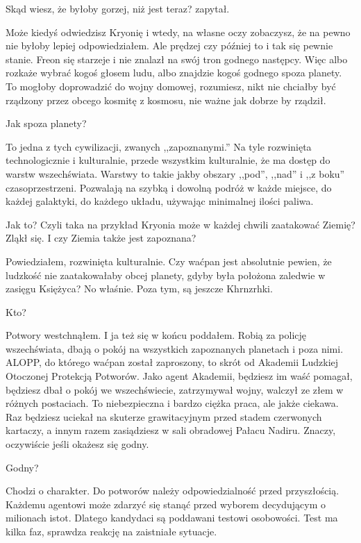 \ds{} Skąd wiesz, że byłoby gorzej, niż jest teraz? \dm{} zapytał. \de{}

\ds{} Może kiedyś odwiedzisz Kryonię i wtedy, na własne oczy zobaczysz, że na pewno nie byłoby lepiej \dm{} odpowiedziałem. \dm{}
Ale prędzej czy później to i tak się pewnie stanie. Freon się starzeje i nie znalazł na swój tron godnego następcy. 
Więc albo rozkaże wybrać kogoś głosem ludu, albo znajdzie kogoś godnego spoza planety. To mogłoby doprowadzić do wojny domowej, 
rozumiesz, nikt nie chciałby być rządzony przez obcego kosmitę z kosmosu, nie ważne jak dobrze by rządził. \de{}

\ds{} Jak spoza planety? \de{}

\ds{} To jedna z tych cywilizacji, zwanych ,,zapoznanymi.'' Na tyle rozwinięta technologicznie i kulturalnie, przede wszystkim kulturalnie, 
że ma dostęp do warstw wszechświata. Warstwy to takie jakby obszary ,,pod'', ,,nad'' i ,,z boku'' czasoprzestrzeni.
Pozwalają na szybką i dowolną podróż w każde miejsce, do każdej galaktyki, do każdego układu, używając minimalnej ilości paliwa. \de{}

\ds{} Jak to? Czyli taka na przykład Kryonia może w każdej chwili zaatakować Ziemię? \dm{} Zląkł się. \dm{} I czy Ziemia także jest zapoznana? \de{}

\ds{} Powiedziałem, rozwinięta kulturalnie. Czy waćpan jest absolutnie pewien, że ludzkość nie zaatakowałaby obcej planety, gdyby była położona zaledwie w zasięgu Księżyca? 
No właśnie. Poza tym, są jeszcze Khrnzrhki. \de{}

\ds{} Kto? \de{}

\ds{} Potwory \dm{} westchnąłem. I ja też się w końcu poddałem. \dm{} Robią za policję wszechświata, dbają o pokój na wszystkich zapoznanych planetach i poza nimi. 
ALOPP, do którego waćpan został zaproszony, to skrót od Akademii Ludzkiej Otoczonej Protekcją Potworów. 
Jako agent Akademii, będziesz im waść pomagał, będziesz dbał o pokój we wszechświecie, zatrzymywał wojny, walczył ze złem w różnych postaciach. 
To niebezpieczna i bardzo ciężka praca, ale jakże ciekawa.
Raz będziesz uciekał na skuterze grawitacyjnym przed stadem czerwonych kartaczy, a innym razem zasiądziesz w sali obradowej Pałacu Nadiru. 
Znaczy, oczywiście jeśli okażesz się godny. \de{}

\ds{} Godny? \de{}

\ds{} Chodzi o charakter. Do potworów należy odpowiedzialność przed przyszłością. 
Każdemu agentowi może zdarzyć się stanąć przed wyborem decydującym o milionach istot. 
Dlatego kandydaci są poddawani testowi osobowości. Test ma kilka faz, sprawdza reakcję na zaistniałe sytuacje. \de{}

